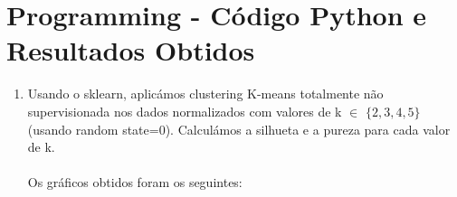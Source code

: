 \documentclass[a4paper,12pt]{article} %
\begin{document}
\clearpage

\section*{Programming - Código Python e Resultados Obtidos}

\begin{enumerate}

\item 

Usando o sklearn, aplicámos clustering K-means totalmente não supervisionada nos dados normalizados com valores de k $\in$ $\{2, 3, 4, 5\}$ (usando random state=0). Calculámos a silhueta e a pureza para cada valor de k. \\ \\

Os gráficos obtidos foram os seguintes:


\end{enumerate}
\end{document}
